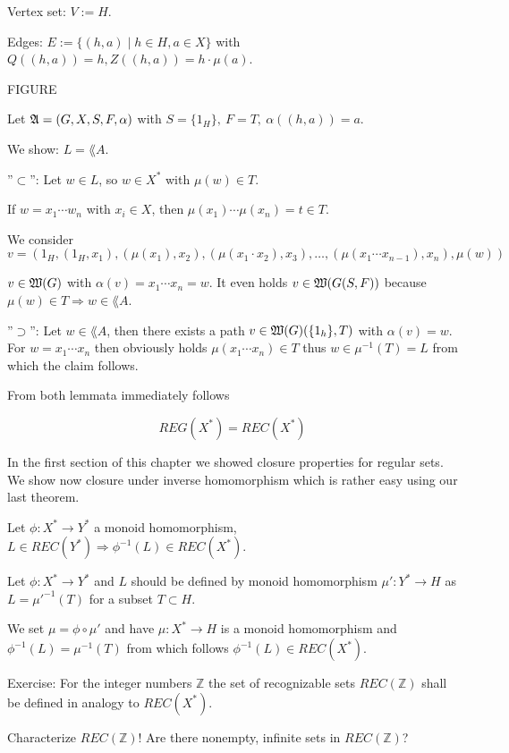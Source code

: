 Vertex set: $V := H$.

Edges: $E := \{ (h, a) \mid h \in H, a \in X \}$ with $Q((h,a)) = h, Z((h,a))
= h \cdot \mu(a)$.

FIGURE

Let $\mbox{$\mathfrak{A}$} = (G, X, S, F, \alpha)$ with $S = \{ 1_H \},\ F = T,\ \alpha((h, a))
= a$.

We show: $L = \lang{A}$.

''$\subset$'': Let $w \in L$, so $w \in X^*$ with $\mu(w) \in T$.

If $w = x_1 \cdots w_n$ with $x_i \in X$, then $\mu(x_1) \cdots \mu(x_n) = t
\in T$.

We consider \[ v = (1_H, (1_H, x_1), (\mu(x_1), x_2), (\mu(x_1 \cdot x_2),
x_3), \ldots, (\mu(x_1 \cdots x_{n-1}), x_n), \mu(w)) \]

$v \in \mbox{$\mathfrak{W}(G)$}$ with $\alpha(v) = x_1 \cdots x_n = w$. It even holds $v \in
\mbox{$\mathfrak{W}(G(S, F))$}$ because $\mu(w) \in T \Rightarrow w \in \lang{A}$.

''$\supset$'': Let $w \in \lang{A}$, then there exists a path $v \in
\mbox{$\mathfrak{W}(G)$}(\{1_h\}, T)$ with $\alpha(v) = w$. For $w = x_1 \cdots x_n$ then
obviously holds $\mu(x_1 \cdots x_n) \in T$ thus $w \in \mu^{-1}(T) = L$ from
which the claim follows.

From both lemmata immediately follows

\begin{theorem}
\[ REG(X^*) = REC(X^*) \]
\end{theorem}

In the first section of this chapter we showed closure properties for regular
sets. We show now closure under inverse homomorphism which is rather easy using
our last theorem.

\begin{theorem}
Let $\phi : X^* \to Y^*$ a monoid homomorphism, $L \in REC(Y^*) \Rightarrow
\phi^{-1}(L) \in REC(X^*)$.
\end{theorem}

Let $\phi : X^* \to Y^*$ and $L$ should be defined by monoid homomorphism $\mu'
: Y^* \to H$ as $L = \mu'^{-1}(T)$ for a subset $T \subset H$.

We set $\mu = \phi \circ \mu'$ and have $\mu : X^* \to H$ is a monoid
homomorphism and $\phi^{-1}(L) = \mu^{-1}(T)$ from which follows $\phi^{-1}(L)
\in REC(X^*)$.

Exercise: For the integer numbers $\mathbb{Z}$ the set of recognizable sets
$REC(\mathbb{Z})$ shall be defined in analogy to $REC(X^*)$.

Characterize $REC(\mathbb{Z})$! Are there nonempty, infinite sets in
$REC(\mathbb{Z})$?
